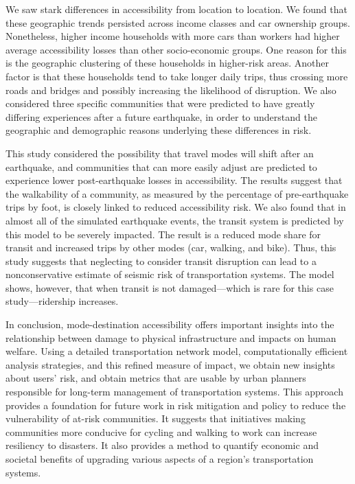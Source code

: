 
We saw stark differences in accessibility from location to location. We found that these geographic trends persisted across income classes and car ownership groups. Nonetheless, higher income households with more cars than workers had higher average accessibility losses than other socio-economic groups. One reason for this is the geographic clustering of these households in higher-risk areas. Another factor is that these households tend to take longer daily trips, thus crossing more roads and bridges and possibly increasing the likelihood of disruption. We also considered three specific communities that were predicted to have greatly differing experiences after a future earthquake, in order to understand the geographic and demographic reasons underlying these differences in risk.

This study considered the possibility that travel modes will shift after an earthquake, and communities that can more easily adjust are predicted to experience lower post-earthquake losses in accessibility. The results suggest that the walkability of a community, as measured by the percentage of pre-earthquake trips by foot, is closely linked to reduced accessibility risk. 
We also found that in almost all of the simulated earthquake events, the transit system is predicted by this model to be severely impacted. The result is a reduced mode share for transit and increased trips by other modes (car, walking, and bike). Thus, this study suggests that neglecting to consider transit disruption can lead to a nonconservative estimate of seismic risk of transportation systems. The model shows, however, that when transit is not damaged---which is rare for this case study---ridership increases.

In conclusion,  mode-destination accessibility offers important insights into the relationship between damage to physical infrastructure and impacts on human welfare. 
Using a detailed transportation network model, computationally efficient analysis strategies, and this refined measure of impact, we obtain new insights about users' risk, and obtain metrics that are usable by urban planners responsible for long-term management of  transportation systems.
This approach provides a foundation for future work in risk mitigation and policy to reduce the vulnerability of at-risk communities. It  suggests that initiatives making communities more conducive for cycling and walking to work can increase resiliency to disasters. It also provides a method to quantify economic and societal benefits of upgrading various aspects of a region's transportation systems.

